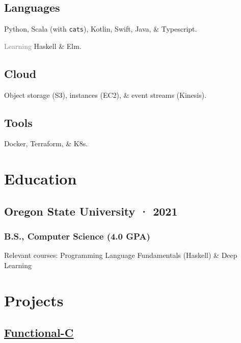 \documentclass[12pt]{article} %
\let\defaultref\href
\renewcommand{\href}[2]{%
  \defaultref{#1}{\ul{#2}}%
}
\renewcommand{\emph}[1]{%
  \textcolor{gray}{#1}%
}
\begin{document}
\begin{paracol}{2}
\begin{raggedright}
\hypertarget{languages}{%
\subsection{Languages}\label{languages}}

Python, Scala (with \texttt{cats}), Kotlin, Swift, Java, \& Typescript.

\emph{Learning} Haskell \& Elm.

\hypertarget{cloud}{%
\subsection{Cloud}\label{cloud}}

Object storage (S3), instances (EC2), \& event streams (Kinesis).

\hypertarget{tools}{%
\subsection{Tools}\label{tools}}

Docker, Terraform, \& K8s.

\hypertarget{education}{%
\section{Education}\label{education}}

\hypertarget{oregon-state-university-2021}{%
\subsection{Oregon State University ·
2021}\label{oregon-state-university-2021}}

\vspace{-5pt}

\hypertarget{b.s.-computer-science-4.0-gpa}{%
\subsubsection{B.S., Computer Science (4.0
GPA)}\label{b.s.-computer-science-4.0-gpa}}

Relevant courses: Programming Language Fundamentals (Haskell) \& Deep
Learning

\hypertarget{projects}{%
\section{Projects}\label{projects}}

\hypertarget{functional-c}{%
\subsection{\texorpdfstring{\href{https://github.com/julianfortune/CS381Project}{Functional-C}}{Functional-C}}\label{functional-c}}


\end{raggedright}
\end{paracol}
\end{document}
